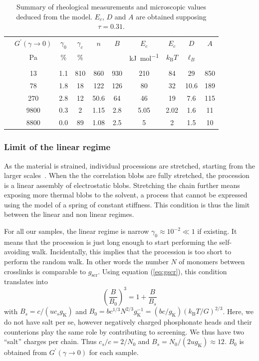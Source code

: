 \documentclass[journal=jacsat,manuscript=article]{achemso}
\begin{document}
\begin{table}
\begin{tabular}{@{}l|SSS|SSSSSS@{}}
& {$G^\prime(\gamma\rightarrow 0)$} & {$\gamma_0$} & {$\gamma_c$} & {$n$} & {$B$} & {$E_c$} & {$E_c$} & {$D$} & {$A$}\\
&	{\si{\pascal}} & {\%} & {\%} & & & {\si{\kilo\joule\per\mole}}& {$k_\mathrm{B}T$} & {$\ell_B$}&\\\hline&&&&&\\[-10pt]
	& 13	&	1.1	&	810	&	860	&	930	&	210	&	84	&	29	&	850\\
		& 78	&	1.8	&	18	&	122	&	126	&	80	&	32	&	10.6	&	189\\
	& 270 	&	2.8	&	12	&	50.6	&	64	&	46	&	19	&	7.6	&	115\\
	& 9800 	& 	0.3	&	2	&	1.15	&	2.8	&	5.05	&	2.02	&	1.6	&	11\\
	& 8800	&	0.0	&	89	&	1.08	&	2.5	&	5	&	2	&	1.5	&	10\\
\end{tabular}
\caption{Summary of rheological measurements and microscopic values deduced from the model. $E_c$, $D$ and $A$ are obtained supposing $\tau=0.31$.}
\label{tab:results}
\end{table}

\subsubsection{Limit of the linear regime}

As the material is strained, individual processions are stretched, starting from the larger scales~\cite{Pincus1976}. When the the correlation blobs are fully stretched, the procession is a linear assembly of electrostatic blobs. Stretching the chain further means exposing more thermal blobs to the solvent, a process that cannot be expressed using the model of a spring of constant stiffness. This condition is thus the limit between the linear and non linear regimes.

For all our samples, the linear regime is narrow $\gamma_0\approx 10^{-2}\ll 1$ if existing. It means that the procession is just long enough to start performing the self-avoiding walk. Incidentally, this implies that the procession is too short to perform the random walk. In other words the number $N$ of monomers between crosslinks is comparable to $g_\mathrm{scr}$. Using equation (\ref{eq:gscr}), this condition translates into
\begin{equation}
\left(\frac{B}{B_0}\right)^3 = 1 + \frac{B}{B_s}
\label{eq:solveB}
\end{equation}
with $B_s = c/(u c_s g_\mathrm{K})$ and $B_0 = b c^{1/3} N^{2/3} g_\mathrm{K}^{-1} = (bc/g_\mathrm{K}) \left(k_\mathrm{B}T/G\right)^{2/3}$. Here, we do not have salt per se, however negatively charged phosphonate heads and their counterions play the same role by contributing to screening. We thus have two ``salt'' charges per chain. Thus $c_s/c = 2/N_0$ and $B_s = N_0/(2u g_\mathrm{K}) \approx 12$. $B_0$ is obtained from $G^\prime(\gamma\rightarrow 0)$ for each sample.
\end{document}
